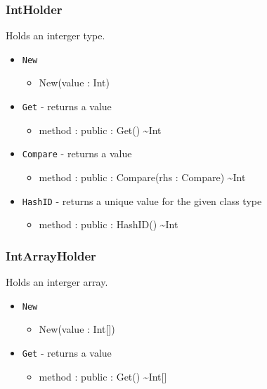 \documentclass[11pt]{article}
\begin{document}
\subsubsection{IntHolder}
Holds an interger type.
\begin{itemize}
\item \texttt{New}
  \begin{itemize}
  \item New(value : Int)
  \end{itemize}
\item \texttt{Get} - returns a value
  \begin{itemize}
  \item method : public : Get() \textasciitilde Int
  \end{itemize}
\item \texttt{Compare} - returns a value
  \begin{itemize}
  \item method : public : Compare(rhs : Compare) \textasciitilde Int
  \end{itemize}
\item \texttt{HashID} - returns a unique value for the given class
  type
  \begin{itemize}
  \item method : public : HashID() \textasciitilde Int
  \end{itemize}
\end{itemize}

\subsubsection{IntArrayHolder}
Holds an interger array.
\begin{itemize}
\item \texttt{New}
  \begin{itemize}
  \item New(value : Int[])
  \end{itemize}
\item \texttt{Get} - returns a value
  \begin{itemize}
  \item method : public : Get() \textasciitilde Int[]
  \end{itemize}
\end{itemize}
\end{document}
